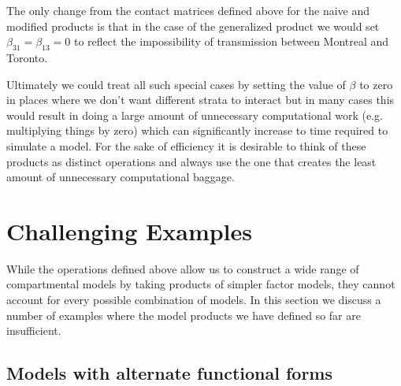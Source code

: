 The only change from the contact matrices defined above for the naive and modified products is that in the case of the generalized product we would set $\beta_{31} = \beta_{13} = 0$ to reflect the impossibility of transmission between Montreal and Toronto.

Ultimately we could treat all such special cases by setting the value of $\beta$ to zero in places where we don't want different strata to interact but in many cases this would result in doing a large amount of unnecessary computational work (e.g. multiplying things by zero) which can significantly increase to time required to simulate a model. For the sake of efficiency it is desirable to think of these products as distinct operations and always use the one that creates the least amount of unnecessary computational baggage. 

\section{Challenging Examples}\label{unco}
While the operations defined above allow us to construct a wide range of compartmental models by taking products of simpler factor models, they cannot account for every possible combination of models. In this section we discuss a number of examples where the model products we have defined so far are insufficient.

\subsection{Models with alternate functional forms}\label{aff}


